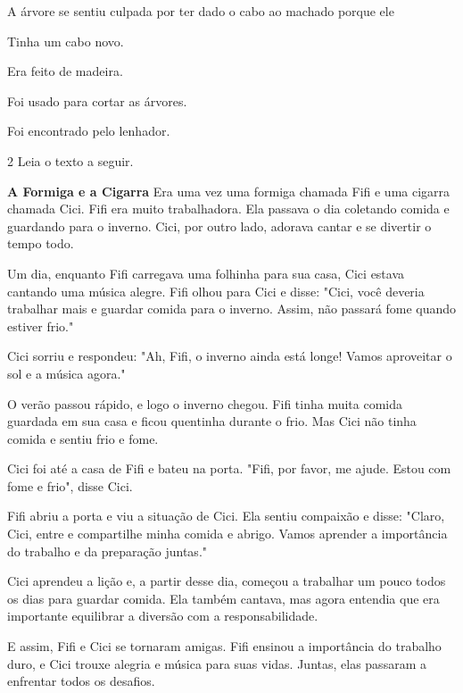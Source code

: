 \pagebreak
A árvore se sentiu culpada por ter dado o cabo ao machado porque ele

\begin{multicols}{2}
\begin{escolha}
\item Tinha um cabo novo.

\item Era feito de madeira.

\item Foi usado para cortar as árvores.

\item Foi encontrado pelo lenhador.
\end{escolha}
\end{multicols}

\num{2} Leia o texto a seguir.

\begin{myquote}
\textbf{A Formiga e a Cigarra}
Era uma vez uma formiga chamada Fifi e uma cigarra chamada Cici. Fifi era muito trabalhadora. Ela passava o dia coletando comida e guardando para o inverno. Cici, por outro lado, adorava cantar e se divertir o tempo todo.

Um dia, enquanto Fifi carregava uma folhinha para sua casa, Cici estava cantando uma música alegre. Fifi olhou para Cici e disse: "Cici, você deveria trabalhar mais e guardar comida para o inverno. Assim, não passará fome quando estiver frio."

Cici sorriu e respondeu: "Ah, Fifi, o inverno ainda está longe! Vamos aproveitar o sol e a música agora."

O verão passou rápido, e logo o inverno chegou. Fifi tinha muita comida guardada em sua casa e ficou quentinha durante o frio. Mas Cici não tinha comida e sentiu frio e fome.

Cici foi até a casa de Fifi e bateu na porta. "Fifi, por favor, me ajude. Estou com fome e frio", disse Cici.

Fifi abriu a porta e viu a situação de Cici. Ela sentiu compaixão e disse: "Claro, Cici, entre e compartilhe minha comida e abrigo. Vamos aprender a importância do trabalho e da preparação juntas."

Cici aprendeu a lição e, a partir desse dia, começou a trabalhar um pouco todos os dias para guardar comida. Ela também cantava, mas agora entendia que era importante equilibrar a diversão com a responsabilidade.

E assim, Fifi e Cici se tornaram amigas. Fifi ensinou a importância do trabalho duro, e Cici trouxe alegria e música para suas vidas. Juntas, elas passaram a enfrentar todos os desafios.
\end{myquote}

